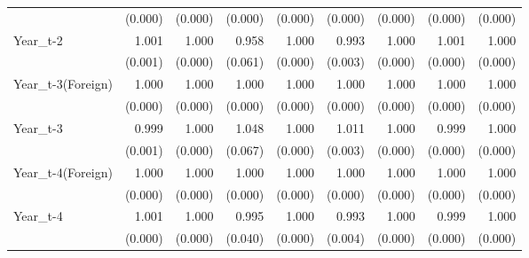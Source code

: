 \begin{table}[htbp]
\begin{tabular}{l*{8}{D{.}{.}{-1}}}
                    &     (0.000)         &     (0.000)         &     (0.000)         &     (0.000)         &     (0.000)         &     (0.000)         &     (0.000)         &     (0.000)         \\
Year\_t-2            &       1.001         &       1.000\sym{\%}  &       0.958         &       1.000         &       0.993\sym{**} &       1.000         &       1.001\sym{***}&       1.000\sym{***}\\
                    &     (0.001)         &     (0.000)         &     (0.061)         &     (0.000)         &     (0.003)         &     (0.000)         &     (0.000)         &     (0.000)         \\
Year\_t-3(Foreign)   &       1.000         &       1.000         &       1.000         &       1.000\sym{**} &       1.000         &       1.000         &       1.000\sym{*}  &       1.000\sym{\%}  \\
                    &     (0.000)         &     (0.000)         &     (0.000)         &     (0.000)         &     (0.000)         &     (0.000)         &     (0.000)         &     (0.000)         \\
Year\_t-3            &       0.999\sym{*}  &       1.000\sym{**} &       1.048         &       1.000         &       1.011\sym{***}&       1.000         &       0.999\sym{*}  &       1.000\sym{**} \\
                    &     (0.001)         &     (0.000)         &     (0.067)         &     (0.000)         &     (0.003)         &     (0.000)         &     (0.000)         &     (0.000)         \\
Year\_t-4(Foreign)   &       1.000         &       1.000\sym{*}  &       1.000         &       1.000         &       1.000         &       1.000         &       1.000         &       1.000         \\
                    &     (0.000)         &     (0.000)         &     (0.000)         &     (0.000)         &     (0.000)         &     (0.000)         &     (0.000)         &     (0.000)         \\
Year\_t-4            &       1.001         &       1.000         &       0.995         &       1.000         &       0.993\sym{*}  &       1.000         &       0.999\sym{***}&       1.000\sym{**} \\
                    &     (0.000)         &     (0.000)         &     (0.040)         &     (0.000)         &     (0.004)         &     (0.000)         &     (0.000)         &     (0.000)         \\

\end{tabular}
\end{table}
